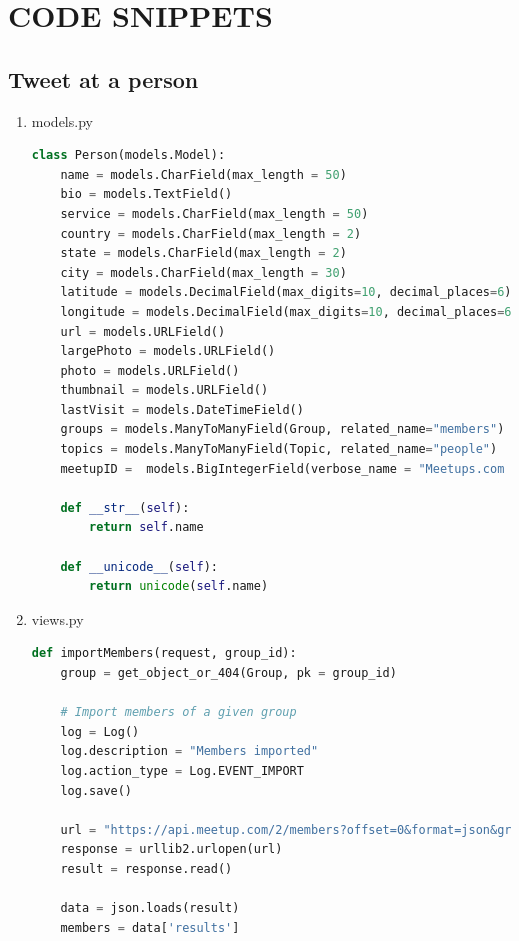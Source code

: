 \documentclass[letterpaper,10pt,onecolumn]{IEEEtran} %
\begin{document}
\section{CODE SNIPPETS}

\subsection{Tweet at a person}
\begin{enumerate}
\item models.py
\begin{center}
\begin{lstlisting}[language=Python]
class Person(models.Model):
    name = models.CharField(max_length = 50)
    bio = models.TextField()
    service = models.CharField(max_length = 50)
    country = models.CharField(max_length = 2)
    state = models.CharField(max_length = 2)
    city = models.CharField(max_length = 30)
    latitude = models.DecimalField(max_digits=10, decimal_places=6)
    longitude = models.DecimalField(max_digits=10, decimal_places=6)
    url = models.URLField()
    largePhoto = models.URLField()
    photo = models.URLField()
    thumbnail = models.URLField()
    lastVisit = models.DateTimeField()
    groups = models.ManyToManyField(Group, related_name="members")
    topics = models.ManyToManyField(Topic, related_name="people")
    meetupID =  models.BigIntegerField(verbose_name = "Meetups.com ID", unique=True)

    def __str__(self):
        return self.name

    def __unicode__(self):
        return unicode(self.name)
\end{lstlisting}
\end{center}

\item views.py
\begin{center}
\begin{lstlisting}[language=Python]
def importMembers(request, group_id):
    group = get_object_or_404(Group, pk = group_id)

    # Import members of a given group
    log = Log()
    log.description = "Members imported"
    log.action_type = Log.EVENT_IMPORT
    log.save()

    url = "https://api.meetup.com/2/members?offset=0&format=json&group_id=" + str(group.meetupID) + "&photo-host=public&page=500&sig_id=148657742&key=" + MEETUP_API_KEY
    response = urllib2.urlopen(url)
    result = response.read()

    data = json.loads(result)
    members = data['results']


\end{lstlisting}
\end{center}
\end{enumerate}
\end{document}
